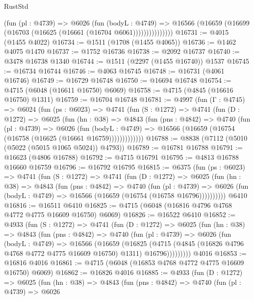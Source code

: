 \begin{lexlean}{RustStd}
\begin{coremodule}
                  (fun (pl : @4739) =>
                  @6026
                    (fun (bodyL : @4749) =>
                    @16566 (@16659 (@16699 (@16703 (@16625 (@16661 (@16704 @6061)))))))))))))))
@16731 := @4015 (@1455 @4022)
@16734 := @1511 (@1708 (@1455 @4065))
@16736 := @1462 @4075 @1470
@16737 := @1752 @16736
@16738 := @2092 @16737
@16740 := @3478 @16738 @1340
@16744 := @1511 (@2297 (@1455 @16740)) @1537
@16745 := @16734 @16744
@16746 := @4063 @16745
@16748 := @16731 (@4061 @16746)
@16749 := @16729 @16748
@16750 := @16694 @16748
@16754 := @4715 (@6048 (@16611 @16750) @6069)
@16758 := @4715 (@4845 (@16616 @16750) @1311)
@16759 := @16704 @16748
@16781 := @4997
    (fun (Γ : @4745) =>
    @6024
      (fun (ps : @6023) =>
      @4741
        (fun (S : @1272) =>
        @4741
          (fun (D : @1272) =>
          @6025
            (fun (hn : @38) =>
            @4843
              (fun (pns : @4842) =>
              @4740
                (fun (pl : @4739) =>
                @6026
                  (fun (bodyL : @4749) =>
                  @16566 (@16659 (@16754 (@16758 (@16625 (@16661 @16759)))))))))))))
@16788 := @8838 (@7112 (@5010 (@5022 (@5015 @1065 @5024)) @4793))
@16789 := @16781 @16788
@16791 := @16623 (@4806 @16788)
@16792 := @4715 @16791
@16795 := @4813 @16788 @16660 @16759
@16796 := @16792 @16795
@16815 := @6375
    (fun (ps : @6023) =>
    @4741
      (fun (S : @1272) =>
      @4741
        (fun (D : @1272) =>
        @6025
          (fun (hn : @38) =>
          @4843
            (fun (pns : @4842) =>
            @4740
              (fun (pl : @4739) =>
              @6026 (fun (bodyL : @4749) => @16566 (@16659 (@16754 (@16758 @16796))))))))))
    @6410
@16816 := @16511 @6410
@16825 := @4715 (@6048 (@16816 @4796 @4768 @4772 @4775 @16609 @16750) @6069)
@16826 := @16522 @6410
@16852 := @4933
    (fun (S : @1272) =>
    @4741
      (fun (D : @1272) =>
      @6025
        (fun (hn : @38) =>
        @4843
          (fun (pns : @4842) =>
          @4740
            (fun (pl : @4739) =>
            @6026
              (fun (bodyL : @4749) =>
              @16566
                (@16659
                  (@16825
                    (@4715
                      (@4845 (@16826 @4796 @4768 @4772 @4775 @16609 @16750) @1311)
                      @16796)))))))))
    @4016
@16853 := @16816 @4016
@16861 := @4715 (@6048 (@16853 @4768 @4772 @4775 @16609 @16750) @6069)
@16862 := @16826 @4016
@16885 := @4933
    (fun (D : @1272) =>
    @6025
      (fun (hn : @38) =>
      @4843
        (fun (pns : @4842) =>
        @4740
          (fun (pl : @4739) =>
          @6026

\end{coremodule}
\end{lexlean}

